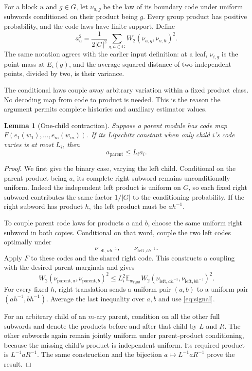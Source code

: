 \documentclass[11pt]{article}
\newtheorem{lemma}[theorem]{Lemma}
\theoremstyle{remark}\newtheorem{remark}[theorem]{Remark}
\newcommand{\E}{\mathbb E}
\newcommand{\W}{W_2}
\begin{document}
For a block $u$ and $g\in G$, let $\nu_{u,g}$ be the law of its boundary
code under uniform subwords conditioned on their product being $g$. Every
group product has positive probability, and the code laws have finite
support. Define
\begin{equation}\label{eq:signal}
 a_u^2=\frac1{2|G|^2}\sum_{g,h\in G}
                      \W(\nu_{u,g},\nu_{u,h})^2.
\end{equation}
The same notation agrees with the earlier input definition: at a leaf,
$\nu_{i,g}$ is the point mass at $E_i(g)$, and the average squared distance
of two independent points, divided by two, is their variance.

The conditional laws couple away arbitrary variation within a fixed product
class. No decoding map from code to product is needed. This is the reason the
argument permits complete histories and auxiliary estimator values.

\begin{lemma}[One-child contraction]\label{lem:contraction}
Suppose a parent module has code map
$F(e_1(w_1),\ldots,e_m(w_m))$. If its Lipschitz constant when only child
$i$'s code varies is at most $L_i$, then
\[
 a_{\mathrm{parent}}\le L_i a_i.
\]
\end{lemma}
\begin{proof}
We first give the binary case, varying the left child. Conditional on the
parent product being $a$, its complete right subword remains unconditionally
uniform. Indeed the independent left product is uniform on $G$, so each
fixed right subword contributes the same factor $1/|G|$ to the conditioning
probability. If the right subword has product $h$, the left product must be
$a h^{-1}$.

To couple parent code laws for products $a$ and $b$, choose the same uniform
right subword in both copies. Conditional on that word, couple the two left
codes optimally under
\[
 \nu_{\mathrm{left},a h^{-1}},\qquad
 \nu_{\mathrm{left},b h^{-1}}.
\]
Apply $F$ to these codes and the shared right code. This constructs a coupling
with the desired parent marginals and gives
\[
 \W(\nu_{\mathrm{parent},a},\nu_{\mathrm{parent},b})^2
 \le L_i^2\E_{w_{\mathrm{right}}}
       \W(\nu_{\mathrm{left},a h^{-1}},
           \nu_{\mathrm{left},b h^{-1}})^2.
\]
For every fixed $h$, right translation sends a uniform pair $(a,b)$ to a
uniform pair $(a h^{-1},b h^{-1})$. Average the last inequality over $a,b$
and use \eqref{eq:signal}.

For an arbitrary child of an $m$-ary parent, condition on all the other full
subwords and denote the products before and after that child by $L$ and $R$.
The other subwords again remain jointly uniform under parent-product
conditioning, because the missing child's product is independent uniform.
Its required product is $L^{-1}aR^{-1}$. The same construction and the
bijection $a\mapsto L^{-1}aR^{-1}$ prove the result.
\end{proof}
\end{document}
